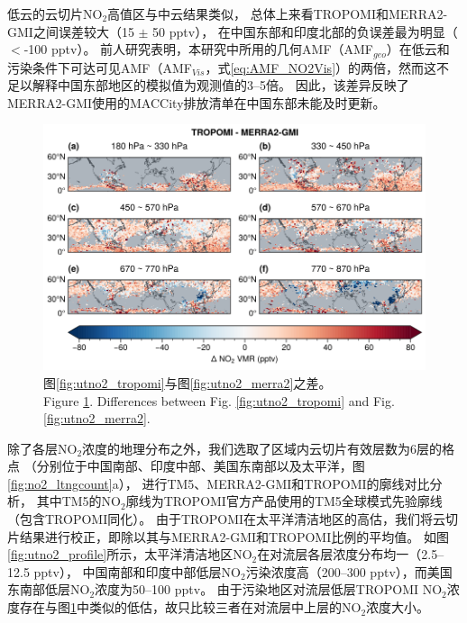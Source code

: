 低云的云切片NO$_2$高值区与中云结果类似，
总体上来看TROPOMI和MERRA2-GMI之间误差较大（15 $\pm$ 50 pptv），
在中国东部和印度北部的负误差最为明显（$<$-100 pptv）。
前人研究表明，本研究中所用的几何AMF（AMF$_{geo}$）在低云和污染条件下可达可见AMF（AMF$_{Vis}$，式\ref{eq:AMF_NO2Vis}）的两倍\citep{BelmonteRivas.2015}，然而这不足以解释中国东部地区的模拟值为观测值的3--5倍。
因此，该差异反映了MERRA2-GMI使用的MACCity排放清单在中国东部未能及时更新。


\begin{figure}[H]
    \centering
    \includegraphics[width=13cm]{./figures/utno2_delta.png}
    \caption{
    图\ref{fig:utno2_tropomi}与图\ref{fig:utno2_merra2}之差。 \\
    Figure \ref{fig:utno2_delta}. Differences between Fig. \ref{fig:utno2_tropomi} and Fig. \ref{fig:utno2_merra2}.
    }
    \label{fig:utno2_delta}
\end{figure}



除了各层NO$_2$浓度的地理分布之外，我们选取了区域内云切片有效层数为6层的格点
（分别位于中国南部、印度中部、美国东南部以及太平洋，图\ref{fig:no2_ltngcount}a），
进行TM5、MERRA2-GMI和TROPOMI的廓线对比分析，
其中TM5的NO$_2$廓线为TROPOMI官方产品使用的TM5全球模式先验廓线（包含TROPOMI同化）。
由于TROPOMI在太平洋清洁地区的高估，我们将云切片结果进行校正，即除以其与MERRA2-GMI和TROPOMI比例的平均值。
如图\ref{fig:utno2_profile}所示，太平洋清洁地区NO$_2$在对流层各层浓度分布均一（2.5--12.5 pptv），
中国南部和印度中部低层NO$_2$污染浓度高（200--300 pptv），而美国东南部低层NO$_2$浓度为50--100 pptv。
由于污染地区对流层低层TROPOMI NO$_2$浓度存在与图\ref{fig:utno2_delta}中类似的低估，故只比较三者在对流层中上层的NO$_2$浓度大小。

